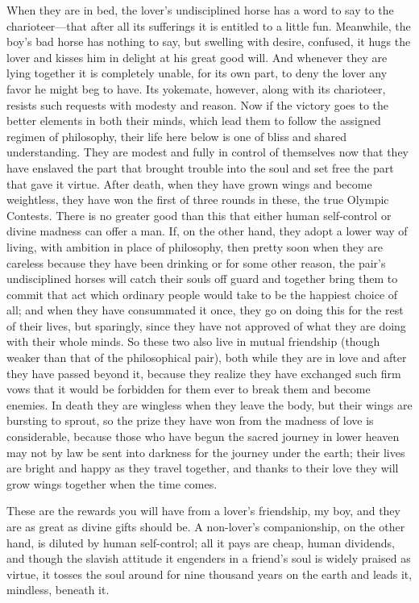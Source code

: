 When they are in bed, the lover’s undisciplined horse has a word to 
say to the charioteer---that after all its sufferings it
is entitled to a little fun. Meanwhile, the boy’s bad horse has nothing
to say, but swelling with desire, confused, it hugs the lover and kisses
him in delight at his great good will. And whenever they are lying
together it is completely unable, for its own part, to deny the lover
any favor he might beg to have. Its yokemate, however, along with its
charioteer, resists such requests with modesty and reason. Now if the
victory goes to the better elements in both their minds, which lead them
to follow the assigned regimen of philosophy, their life here below is
one of bliss and shared understanding. They are modest and fully
in control of themselves now that they have enslaved the part that
brought trouble into the soul and set free the part that gave it virtue.
After death, when they have grown wings and become weightless, they have
won the first of three rounds in these, the true Olympic Contests. There
is no greater good than this that either human self-control or divine
madness can offer a man. If, on the other hand, they adopt a lower way
of living, with ambition in place of philosophy, then pretty soon when 
they are careless because they have been drinking or for some
other reason, the pair’s undisciplined horses will catch their souls off
guard and together bring them to commit that act which ordinary people
would take to be the happiest choice of all; and when they have
consummated it once, they go on doing this for the rest of their lives,
but sparingly, since they have not approved of what they are doing with
their whole minds. So these two also live in mutual friendship (though
weaker than that of the philosophical pair), both while they are in love
and after they have passed beyond it, because they realize they
have exchanged such firm vows that it would be forbidden for them ever
to break them and become enemies. In death they are wingless when they
leave the body, but their wings are bursting to sprout, so the prize
they have won from the madness of love is considerable, because those
who have begun the sacred journey in lower heaven may not by law be sent
into darkness for the journey under the earth; their lives are bright
and happy as they travel together, and thanks to their love they
will grow wings together when the time comes.

These are the rewards you will have from a lover’s friendship, my boy,
and they are as great as divine gifts should be. A non-lover’s
companionship, on the other hand, is diluted by human self-control; all
it pays are cheap, human dividends, and though the slavish attitude it
engenders in a friend’s soul is widely praised as virtue, it tosses the
soul around for nine thousand years on the earth and
leads it, mindless, beneath it.

